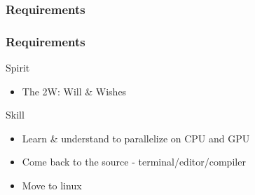 \documentclass{beamer}
\begin{document}
\begin{frame}
  \frametitle{Requirements}
  \begin{figure}
  \end{figure}
\end{frame}

\begin{frame}
  \frametitle{Requirements}
  \begin{block}{Spirit}\footnotesize
      \begin{itemize}
      \item The 2W: Will \& Wishes
      \end{itemize}
  \end{block}
  \begin{block}{Skill}\footnotesize
      \begin{itemize}
      \item Learn \& understand to parallelize on CPU and GPU
      \item Come back to the source - terminal/editor/compiler
      \item Move to linux
      \end{itemize}
  \end{block}
\end{frame}
\end{document}

